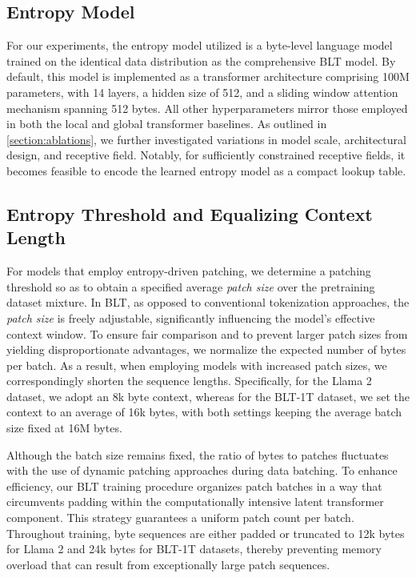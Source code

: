 \subsection{Entropy Model} For our experiments, the entropy model utilized is a byte-level language model trained on the identical data distribution as the comprehensive {\textsc BLT} model. By default, this model is implemented as a transformer architecture comprising 100M parameters, with 14 layers, a hidden size of 512, and a sliding window attention mechanism spanning 512 bytes. All other hyperparameters mirror those employed in both the local and global transformer baselines. As outlined in \autoref{section:ablations}, we further investigated variations in model scale, architectural design, and receptive field. Notably, for sufficiently constrained receptive fields, it becomes feasible to encode the learned entropy model as a compact lookup table.

\subsection{Entropy Threshold and Equalizing Context Length} For models that employ entropy-driven patching, we determine a patching threshold so as to obtain a specified average \textit{patch size} over the pretraining dataset mixture. In {\textsc BLT}, as opposed to conventional tokenization approaches, the \textit{patch size} is freely adjustable, significantly influencing the model’s effective context window. To ensure fair comparison and to prevent larger patch sizes from yielding disproportionate advantages, we normalize the expected number of bytes per batch. As a result, when employing models with increased patch sizes, we correspondingly shorten the sequence lengths. Specifically, for the Llama 2 dataset, we adopt an 8k byte context, whereas for the {\textsc BLT}-1T dataset, we set the context to an average of 16k bytes, with both settings keeping the average batch size fixed at 16M bytes.

Although the batch size remains fixed, the ratio of bytes to patches fluctuates with the use of dynamic patching approaches during data batching. To enhance efficiency, our {\textsc BLT} training procedure organizes patch batches in a way that circumvents padding within the computationally intensive latent transformer component. This strategy guarantees a uniform patch count per batch. Throughout training, byte sequences are either padded or truncated to 12k bytes for Llama 2 and 24k bytes for {\textsc BLT}-1T datasets, thereby preventing memory overload that can result from exceptionally large patch sequences.

